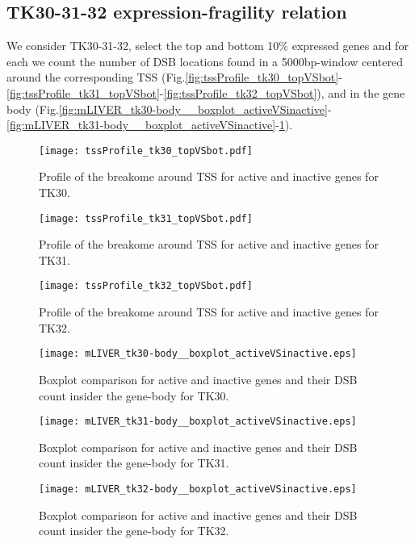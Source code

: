 \documentclass[11pt,a4paper]{article}
\begin{document}
\subsection{TK30-31-32 expression-fragility relation}
We consider TK30-31-32, select the top and bottom 10{\%} expressed genes and for each we count the number of DSB locations found in a 5000bp-window centered around the corresponding TSS (Fig.\ref{fig:tssProfile_tk30_topVSbot}-\ref{fig:tssProfile_tk31_topVSbot}-\ref{fig:tssProfile_tk32_topVSbot}), and in the gene body (Fig.\ref{fig:mLIVER_tk30-body__boxplot_activeVSinactive}-\ref{fig:mLIVER_tk31-body__boxplot_activeVSinactive}-\ref{fig:mLIVER_tk32-body__boxplot_activeVSinactive}). 
\begin{figure}[hbtp]
\begin{minipage}[t]{0.45\textwidth}
\texttt{[image: tssProfile\_tk30\_topVSbot.pdf]}
\caption{Profile of the breakome around TSS for active and inactive genes for TK30.}
\label{fig:tssProfile_tk30_topVSbot}
\end{minipage}
\hspace{\fill}
\begin{minipage}[t]{0.45\textwidth}
\texttt{[image: tssProfile\_tk31\_topVSbot.pdf]}
\caption{Profile of the breakome around TSS for active and inactive genes for TK31.}
\label{fig:tssProfile_tk31_topVSbot}
\end{minipage}
\vspace*{0.5cm} %
\begin{minipage}[t]{0.45\textwidth}
\texttt{[image: tssProfile\_tk32\_topVSbot.pdf]}
\caption{Profile of the breakome around TSS for active and inactive genes for TK32.}
\label{fig:tssProfile_tk32_topVSbot}
\end{minipage}
\hspace{\fill}
\begin{minipage}[t]{0.45\textwidth}
\texttt{[image: mLIVER\_tk30-body\_\_boxplot\_activeVSinactive.eps]}
\caption{Boxplot comparison for active and inactive genes and their DSB count insider the gene-body for TK30.}
\label{fig:mLIVER_tk30-body__boxplot_activeVSinactive}
\end{minipage}
\vspace*{0.5cm}
\begin{minipage}[t]{0.45\textwidth}
\texttt{[image: mLIVER\_tk31-body\_\_boxplot\_activeVSinactive.eps]}
\caption{Boxplot comparison for active and inactive genes and their DSB count insider the gene-body for TK31.}
\label{fig:mLIVER_tk31-body__boxplot_activeVSinactive}
\end{minipage}
\hspace{\fill}
\begin{minipage}[t]{0.45\textwidth}
\texttt{[image: mLIVER\_tk32-body\_\_boxplot\_activeVSinactive.eps]}
\caption{Boxplot comparison for active and inactive genes and their DSB count insider the gene-body for TK32.}
\label{fig:mLIVER_tk32-body__boxplot_activeVSinactive}
\end{minipage}

\end{figure}
\end{document}
